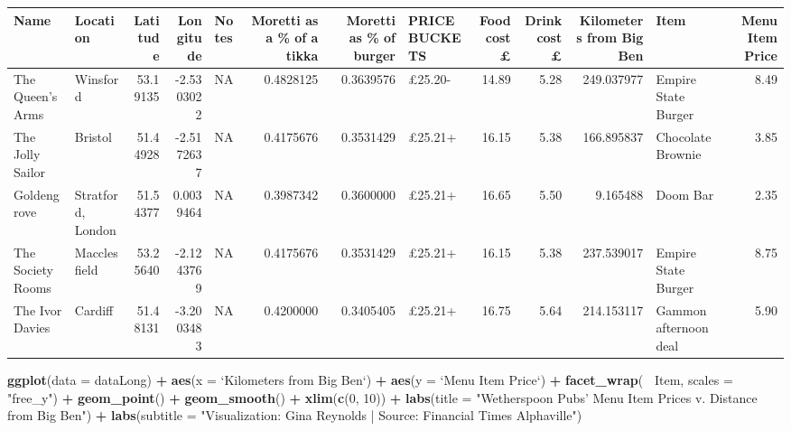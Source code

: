 \documentclass[]{book}
\newenvironment{Shaded}{\begin{snugshade}}{\end{snugshade}}
\newcommand{\KeywordTok}[1]{\textcolor[rgb]{0.13,0.29,0.53}{\textbf{#1}}}
\newcommand{\DataTypeTok}[1]{\textcolor[rgb]{0.13,0.29,0.53}{#1}}
\newcommand{\DecValTok}[1]{\textcolor[rgb]{0.00,0.00,0.81}{#1}}
\newcommand{\StringTok}[1]{\textcolor[rgb]{0.31,0.60,0.02}{#1}}
\newcommand{\OperatorTok}[1]{\textcolor[rgb]{0.81,0.36,0.00}{\textbf{#1}}}
\newcommand{\NormalTok}[1]{#1}
\theoremstyle{definition}
\theoremstyle{definition}
\theoremstyle{definition}
\theoremstyle{remark}
\begin{document}
\begin{tabular}{l|l|r|r|l|r|r|l|r|r|r|l|r}
\hline
Name & Location & Latitude & Longitude & Notes & Moretti as a \% of a tikka & Moretti as \% of burger & PRICE BUCKETS & Food cost £ & Drink cost £ & Kilometers from Big Ben & Item & Menu Item Price\\
\hline
The Queen's Arms & Winsford & 53.19135 & -2.5303022 & NA & 0.4828125 & 0.3639576 & £25.20- & 14.89 & 5.28 & 249.037977 & Empire State Burger & 8.49\\
\hline
The Jolly Sailor & Bristol & 51.44928 & -2.5172637 & NA & 0.4175676 & 0.3531429 & £25.21+ & 16.15 & 5.38 & 166.895837 & Chocolate Brownie & 3.85\\
\hline
Goldengrove & Stratford, London & 51.54377 & 0.0039464 & NA & 0.3987342 & 0.3600000 & £25.21+ & 16.65 & 5.50 & 9.165488 & Doom Bar & 2.35\\
\hline
The Society Rooms & Macclesfield & 53.25640 & -2.1243769 & NA & 0.4175676 & 0.3531429 & £25.21+ & 16.15 & 5.38 & 237.539017 & Empire State Burger & 8.75\\
\hline
The Ivor Davies & Cardiff & 51.48131 & -3.2003483 & NA & 0.4200000 & 0.3405405 & £25.21+ & 16.75 & 5.64 & 214.153117 & Gammon afternoon deal & 5.90\\
\hline
\end{tabular}

\begin{Shaded}
\begin{Highlighting}[]
\KeywordTok{ggplot}\NormalTok{(}\DataTypeTok{data =}\NormalTok{ dataLong) }\OperatorTok{+}
\StringTok{  }\KeywordTok{aes}\NormalTok{(}\DataTypeTok{x =} \StringTok{`}\DataTypeTok{Kilometers from Big Ben}\StringTok{`}\NormalTok{) }\OperatorTok{+}
\StringTok{  }\KeywordTok{aes}\NormalTok{(}\DataTypeTok{y =} \StringTok{`}\DataTypeTok{Menu Item Price}\StringTok{`}\NormalTok{) }\OperatorTok{+}
\StringTok{  }\KeywordTok{facet_wrap}\NormalTok{(}\OperatorTok{~}\StringTok{ }\NormalTok{Item, }\DataTypeTok{scales =} \StringTok{"free_y"}\NormalTok{) }\OperatorTok{+}
\StringTok{  }\KeywordTok{geom_point}\NormalTok{() }\OperatorTok{+}
\StringTok{  }\KeywordTok{geom_smooth}\NormalTok{() }\OperatorTok{+}
\StringTok{  }\KeywordTok{xlim}\NormalTok{(}\KeywordTok{c}\NormalTok{(}\DecValTok{0}\NormalTok{, }\DecValTok{10}\NormalTok{)) }\OperatorTok{+}
\StringTok{  }\KeywordTok{labs}\NormalTok{(}\DataTypeTok{title =} \StringTok{"Wetherspoon Pubs' Menu Item Prices v. Distance from Big Ben"}\NormalTok{) }\OperatorTok{+}
\StringTok{  }\KeywordTok{labs}\NormalTok{(}\DataTypeTok{subtitle =} \StringTok{"Visualization: Gina Reynolds | Source: Financial Times Alphaville"}\NormalTok{) }
\end{Highlighting}
\end{Shaded}
\end{document}
